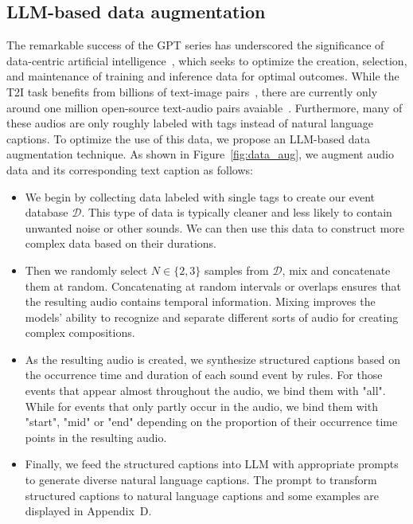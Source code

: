\documentclass{article}
\begin{document}
\subsection{LLM-based data augmentation}
\label{LLMDA}
The remarkable success of the GPT series has underscored the significance of data-centric artificial intelligence~\cite{zha2023data,jakubik2022data}, which seeks to optimize the creation, selection, and maintenance of training and inference data for optimal outcomes. While the T2I task benefits from billions of text-image pairs~\cite{schuhmann2022laion5b}, there are currently only around one million open-source text-audio pairs avaiable~\cite{huang2023makeanaudio}. Furthermore, many of these audios are only roughly labeled with tags instead of natural language captions. To optimize the use of this data, we propose an LLM-based data augmentation technique. As shown in Figure~\ref{fig:data_aug}, we augment audio data and its corresponding text caption as follows:
\begin{itemize}[leftmargin=*]
\item We begin by collecting data labeled with single tags to create our event database $\mathcal{D}$. This type of data is typically cleaner and less likely to contain unwanted noise or other sounds. We can then use this data to construct more complex data based on their durations.
\item Then we randomly select $N \in \{2,3\}$ samples from $\mathcal{D}$, mix and concatenate them at random. Concatenating at random intervals or overlaps ensures that the resulting audio contains temporal information. Mixing improves the models' ability to recognize and separate different sorts of audio for creating complex compositions. 
\item As the resulting audio is created, we synthesize structured captions based on the occurrence time and duration of each sound event by rules. For those events that appear almost throughout the audio, we bind them with "all". While for events that only partly occur in the audio, we bind them with "start", "mid" or "end" depending on the proportion of their occurrence time points in the resulting audio. 
\item Finally, we feed the structured captions into LLM with appropriate prompts to generate diverse natural language captions. The prompt to transform structured captions to natural language captions and some examples are displayed in Appendix~D.
\end{itemize}
\end{document}
